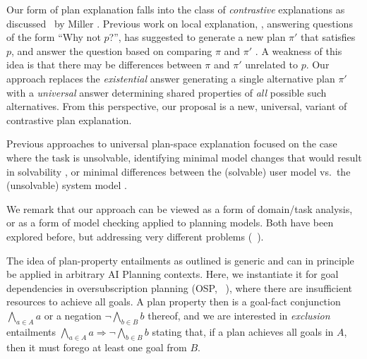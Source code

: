 Our form of plan explanation falls into the class of
\emph{contrastive} explanations as discussed \eg\ by Miller
. Previous work on local explanation, \ie,
answering questions of the form ``Why not $p$?'', has suggested to
generate a new plan $\pi'$ that satisfies $p$, and answer the question
based on comparing $\pi$ and $\pi'$
\cite{smith:aaai-12,fox:etal:ijcai-ws-17}. A weakness of this idea is
that there may be differences between $\pi$ and $\pi'$ unrelated to
$p$. Our approach replaces the \emph{existential} answer generating a
single alternative plan $\pi'$ with a \emph{universal} answer
determining shared properties of \emph{all} possible such
alternatives. From this perspective, our proposal is a new, universal,
variant of contrastive plan explanation.

Previous approaches to universal plan-space explanation focused on the
case where the task is unsolvable, identifying minimal model changes
that would result in solvability \cite{goebelbecker:etal:icaps-10}, or
minimal differences between the (solvable) user model vs.\ the
(unsolvable) system model \cite{sreedharan:etal:ijcai-19}. 
%
%

%
We remark that our approach can be viewed as a form of domain/task
analysis, or as a form of model checking applied to planning
models. Both have been explored before, but addressing very different
problems
(\eg\ \cite{fox:long:jair-98,rintanen:aaai-00,vaquero:etal:keq-13}).


The idea of plan-property entailments as outlined is generic and can
in principle be applied in arbitrary AI Planning contexts. Here, we
instantiate it for goal dependencies in oversubscription planning
(OSP, \eg\ \cite{smith:icaps-04,domshlak:mirkis:jair-15}), where there
are insufficient resources to achieve all goals. A plan property then
is a goal-fact conjunction $\bigwedge_{a \in A} a$ or a negation $\neg
\bigwedge_{b \in B} b$ thereof, and we are interested in
\emph{exclusion} entailments $\bigwedge_{a \in A} a \Rightarrow \neg
\bigwedge_{b \in B} b$ stating that, if a plan achieves all goals in
$A$, then it must forego at least one goal from $B$. 

